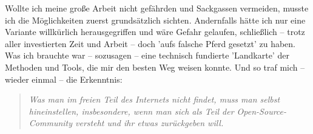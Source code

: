 Wollte ich meine große Arbeit nicht gefährden und Sackgassen vermeiden, musste
ich die Möglichkeiten zuerst grundsätzlich sichten. Andernfalls hätte ich nur
eine Variante willkürlich herausgegriffen und wäre Gefahr gelaufen, schließlich
-- trotz aller investierten Zeit und Arbeit -- doch 'aufs falsche Pferd gesetzt'
zu haben. Was ich brauchte war -- sozusagen -- eine technisch fundierte
'Landkarte' der Methoden und Tools, die mir den besten Weg weisen konnte. Und so
traf mich -- wieder einmal -- die Erkenntnis:

\begin{quote}\textit{Was man im freien Teil des Internets nicht findet, muss man
selbst hineinstellen, insbesondere, wenn man sich als Teil der Open-Source-Community
versteht und ihr etwas zurückgeben will.}
\end{quote}


%
